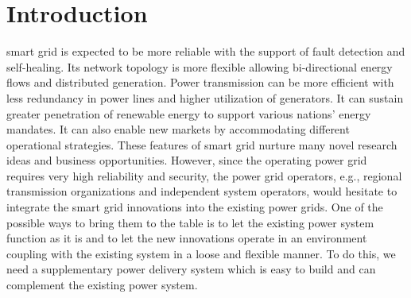 \documentclass[journal]{IEEEtran}
\begin{document}
\section{Introduction}



 smart grid \cite{smartgridintro} is expected to be  more reliable with the support of fault detection and self-healing. Its network topology is more flexible allowing bi-directional energy flows and distributed generation. Power transmission can be more efficient with less redundancy in power lines and higher utilization of generators. It can sustain greater penetration of renewable energy to support various nations' energy mandates. It can also enable new markets by accommodating different operational strategies.
These features of smart grid nurture many novel research ideas and business opportunities. 
However, since the operating power grid requires very high reliability and security, the power grid operators, e.g., regional transmission organizations and independent system operators, would hesitate to integrate the smart grid innovations into the existing power grids. One of the possible ways to bring them to the table is to let the existing power system function as it is and to let the new innovations operate in an environment coupling with the existing system in a loose and flexible manner.
To do this, we need a supplementary power delivery system which is easy to build and can complement the existing power system.
\end{document}
